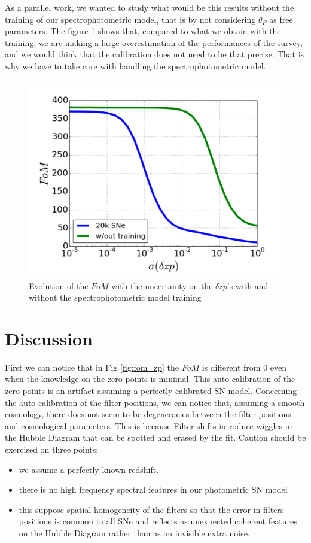 \documentclass[\docopts]{\docclass}
\begin{document}
As a parallel work, we wanted to study what would be this results without the training of our spectrophotometric model, that is by not considering $\theta_P$ as free parameters.
The figure \ref{fig:fom_wout_training} shows that, compared to what we obtain with the training, we are making a large overestimation of the performances of the survey, and we would think that the calibration does not need to be that precise. That is why we have to take care with handling the spectrophotometric model.
\begin{figure}[ht]
  \centering
  \includegraphics[width=\linewidth]{FoM_20k+training.pdf}
  \caption{Evolution of the $FoM$ with the uncertainty on the $\delta zp$'s with and without the spectrophotometric model training}
  \label{fig:fom_wout_training}
\end{figure}


\section{Discussion}
\label{sec::discussion}
First we can notice that in Fig \ref{fig:fom_zp} the $FoM$ is different from 0 even when the knowledge on the zero-points is minimal.
This auto-calibration of the zero-points is an artifact assuming a perfectly calibrated SN model.
Concerning the auto calibration of the filter positions, we can notice that, assuming a smooth cosmology, there does not seem to be degeneracies between the filter positions and cosmological parameters.
This is because Filter shifts introduce wiggles in the Hubble Diagram that can be spotted and erased by the fit.
Caution should be exercised on three points:
\begin{itemize}
\item we assume a perfectly known redshift.
\item there is no high frequency spectral features in our photometric SN model
\item this suppose spatial homogeneity of the filters so that the error in filters positions is common to all SNe and reflects as unexpected coherent features on the Hubble Diagram rather than as an invisible extra noise.
\end{itemize}
\end{document}
